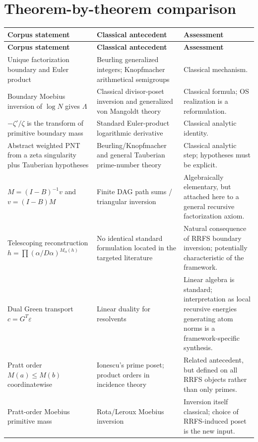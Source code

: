\documentclass[11pt]{article}
\begin{document}
\section{Theorem-by-theorem comparison}
\small
\begin{longtable}{>{\raggedright\arraybackslash}p{}>{\raggedright\arraybackslash}p{}>{\raggedright\arraybackslash}p{}}
\toprule
\textbf{Corpus statement} & \textbf{Classical antecedent} & \textbf{Assessment}\\
\midrule
\endfirsthead
\toprule
\textbf{Corpus statement} & \textbf{Classical antecedent} & \textbf{Assessment}\\
\midrule
\endhead
Unique factorization boundary and Euler product & Beurling generalized integers; Knopfmacher arithmetical semigroups & Classical mechanism.\\
Boundary Moebius inversion of $\log N$ gives $\Lambda$ & Classical divisor-poset inversion and generalized von Mangoldt theory & Classical formula; OS realization is a reformulation.\\
$-\zeta'/\zeta$ is the transform of primitive boundary mass & Standard Euler-product logarithmic derivative & Classical analytic identity.\\
Abstract weighted PNT from a zeta singularity plus Tauberian hypotheses & Beurling/Knopfmacher and general Tauberian prime-number theory & Classical analytic step; hypotheses must be explicit.\\
$M=(I-B)^{-1}v$ and $v=(I-B)M$ & Finite DAG path sums / triangular inversion & Algebraically elementary, but attached here to a general recursive factorization axiom.\\
Telescoping reconstruction $h=\prod(\alpha/D\alpha)^{M_\alpha(h)}$ & No identical standard formulation located in the targeted literature & Natural consequence of RRFS boundary inversion; potentially characteristic of the framework.\\
Dual Green transport $c=G^T\varepsilon$ & Linear duality for resolvents & Linear algebra is standard; interpretation as local recursive energies generating atom norms is a framework-specific synthesis.\\
Pratt order $M(a)\le M(b)$ coordinatewise & Ionescu's prime poset; product orders in incidence theory & Related antecedent, but defined on all RRFS objects rather than only primes.\\
Pratt-order Moebius primitive mass & Rota/Leroux Moebius inversion & Inversion itself classical; choice of RRFS-induced poset is the new input.\\

\end{longtable}
\end{document}
